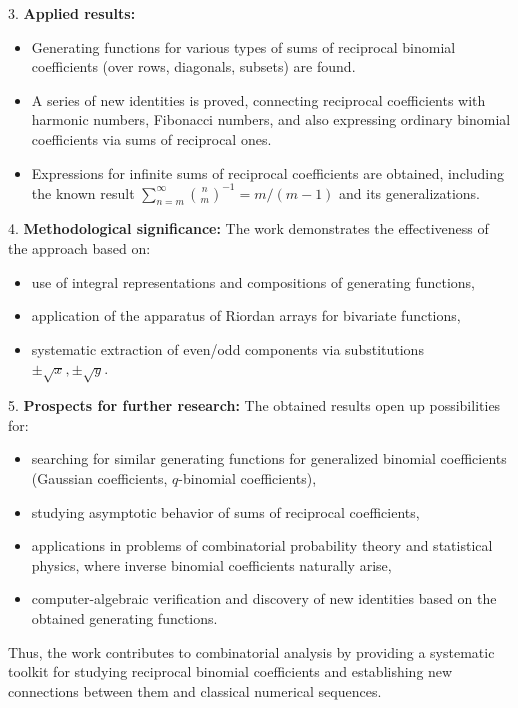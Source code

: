 \documentclass[12pt]{article}
\begin{document}
3. \textbf{Applied results:}
\begin{itemize}
    \item Generating functions for various types of sums of reciprocal binomial coefficients (over rows, diagonals, subsets) are found.
    \item A series of new identities is proved, connecting reciprocal coefficients with harmonic numbers, Fibonacci numbers, and also expressing ordinary binomial coefficients via sums of reciprocal ones.
    \item Expressions for infinite sums of reciprocal coefficients are obtained, including the known result \( \sum_{n=m}^{\infty} \binom{n}{m}^{-1} = m/(m-1) \) and its generalizations.
\end{itemize}

4. \textbf{Methodological significance:}
The work demonstrates the effectiveness of the approach based on:
\begin{itemize}
    \item use of integral representations and compositions of generating functions,
    \item application of the apparatus of Riordan arrays for bivariate functions,
    \item systematic extraction of even/odd components via substitutions\\ \( \pm\sqrt{x}, \pm\sqrt{y} \).
\end{itemize}

5. \textbf{Prospects for further research:}
The obtained results open up possibilities for:
\begin{itemize}
    \item searching for similar generating functions for generalized binomial coefficients (Gaussian coefficients, \( q \)-binomial coefficients),
    \item studying asymptotic behavior of sums of reciprocal coefficients,
    \item applications in problems of combinatorial probability theory and statistical physics, where inverse binomial coefficients naturally arise,
    \item computer-algebraic verification and discovery of new identities based on the obtained generating functions.
\end{itemize}

Thus, the work contributes to combinatorial analysis by providing a systematic toolkit for studying reciprocal binomial coefficients and establishing new connections between them and classical numerical sequences.
\end{document}
